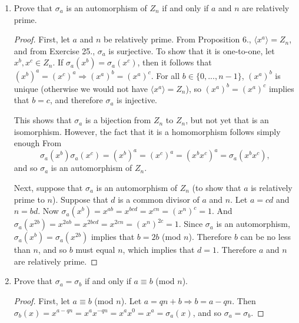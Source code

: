 \documentclass{article}
\begin{document}
\begin{enumerate}[label=(\alph*), itemsep=0em]
    \item Prove that $\sigma_a$ is an automorphism of $Z_n$ if and only if $a$ and $n$ are relatively prime.
          \begin{proof}
            First, let $a$ and $n$ be relatively prime. From Proposition 6., $\langle x^a \rangle = Z_n$, and from Exercise 25., $\sigma_a$ is surjective. To show that it is one-to-one, let $x^b, x^c \in Z_n$. If $\sigma_a(x^b) = \sigma_a(x^c)$, then it follows that $(x^b)^a = (x^c)^a \Rightarrow (x^a)^b = (x^a)^c$. For all $b \in \{ 0, ..., n - 1 \}$, $(x^a)^b$ is unique (otherwise we would not have $\langle x^a \rangle = Z_n$), so $(x^a)^b = (x^a)^c$ implies that $b = c$, and therefore $\sigma_a$ is injective.

            This shows that $\sigma_a$ is a bijection from $Z_n$ to $Z_n$, but not yet that is an isomorphism. However, the fact that it is a homomorphism follows simply enough From
            \begin{equation*}
                \sigma_a(x^b) \sigma_a(x^c) = (x^b)^a = (x^c)^a = (x^b x^c)^a = \sigma_a(x^b x^c),
            \end{equation*}
            and so $\sigma_a$ is an automorphism of $Z_n$.

            Next, suppose that $\sigma_a$ is an automorphism of $Z_n$ (to show that $a$ is relatively prime to $n$). Suppose that $d$ is a common divisor of $a$ and $n$. Let $a = cd$ and $n = bd$. Now $\sigma_a(x^b) = x^{ab} = x^{bcd} = x^{cn} = (x^n)^c = 1$. And $\sigma_a(x^{2b}) = x^{2ab} = x^{2bcd} = x^{2cn} = (x^n)^{2c} = 1$. Since $\sigma_a$ is an automorphism, $\sigma_a(x^b) = \sigma_a(x^{2b})$ implies that $b = 2b$ (mod $n$). Therefore $b$ can be no less than $n$, and so $b$ must equal $n$, which implies that $d = 1$. Therefore $a$ and $n$ are relatively prime.
          \end{proof}
    \item Prove that $\sigma_a = \sigma_b$ if and only if $a \equiv b$ (mod $n$).
          \begin{proof}
            First, let $a \equiv b$ (mod $n$). Let $a = qn + b \Rightarrow b = a - qn$. Then $\sigma_b(x) = x^{a - qn} = x^a x^{-qn} = x^a x^0 = x^a = \sigma_a(x)$, and so $\sigma_a = \sigma_b$.


\end{proof}
\end{enumerate}
\end{document}
